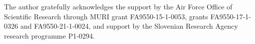 \vfill
The author gratefully acknowledges the support by the Air Force Office of Scientific Research through MURI grant FA9550-15-1-0053, grants FA9550-17-1-0326 and FA9550-21-1-0024, and support by the Slovenian Research Agency research programme P1-0294.

